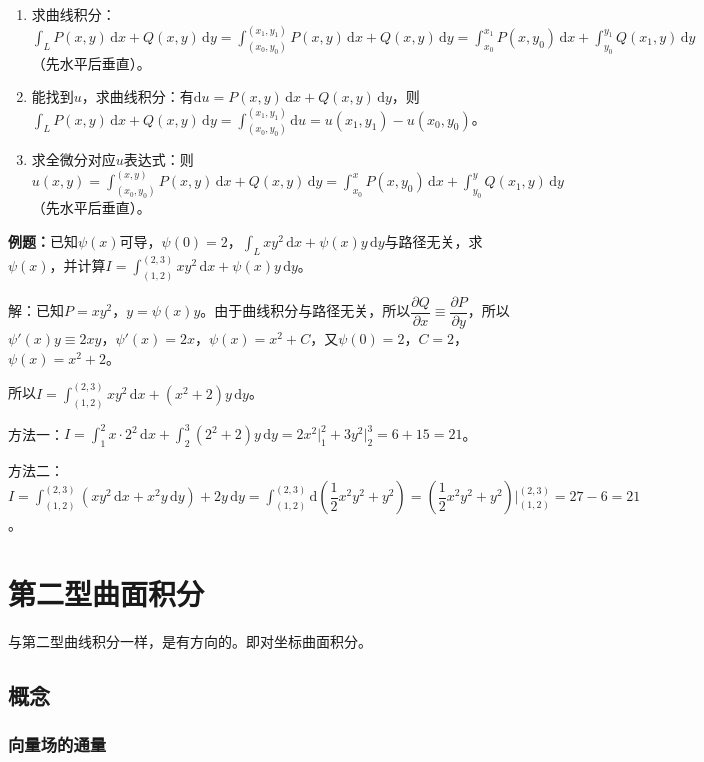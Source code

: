 \documentclass[UTF8, 12pt]{ctexart}
\begin{document}
        \begin{enumerate}
            \item 求曲线积分：$\int_LP(x,y)\,\textrm{d}x+Q(x,y)\,\textrm{d}y=\int_{(x_0,y_0)}^{(x_1,y_1)}P(x,y)\,\textrm{d}x+Q(x,y)\,\textrm{d}y=\int_{x_0}^{x_1}P(x,y_0)\,\textrm{d}x+\int_{y_0}^{y_1}Q(x_1,y)\,\textrm{d}y$（先水平后垂直）。
            \item 能找到$u$，求曲线积分：有$\textrm{d}u=P(x,y)\,\textrm{d}x+Q(x,y)\,\textrm{d}y$，则$\int_LP(x,y)\,\textrm{d}x+Q(x,y)\,\textrm{d}y=\int_{(x_0,y_0)}^{(x_1,y_1)}\textrm{d}u=u(x_1,y_1)-u(x_0,y_0)$。
            \item 求全微分对应$u$表达式：则$u(x,y)=\int_{(x_0,y_0)}^{(x,y)}P(x,y)\,\textrm{d}x+Q(x,y)\,\textrm{d}y=\int_{x_0}^xP(x,y_0)\,\textrm{d}x+\int_{y_0}^yQ(x_1,y)\,\textrm{d}y$（先水平后垂直）。
        \end{enumerate}

        \textbf{例题：}已知$\psi(x)$可导，$\psi(0)=2$，$\int_Lxy^2\,\textrm{d}x+\psi(x)y\,\textrm{d}y$与路径无关，求$\psi(x)$，并计算$I=\int_{(1,2)}^{(2,3)}xy^2\,\textrm{d}x+\psi(x)y\,\textrm{d}y$。

        解：已知$P=xy^2$，$y=\psi(x)y$。由于曲线积分与路径无关，所以$\dfrac{\partial Q}{\partial x}\equiv\dfrac{\partial P}{\partial y}$，所以$\psi'(x)y\equiv2xy$，$\psi'(x)=2x$，$\psi(x)=x^2+C$，又$\psi(0)=2$，$C=2$，$\psi(x)=x^2+2$。

        所以$I=\int_{(1,2)}^{(2,3)}xy^2\,\textrm{d}x+(x^2+2)y\,\textrm{d}y$。

        方法一：$I=\int_1^2x\cdot2^2\,\textrm{d}x+\int_2^3(2^2+2)y\,\textrm{d}y=2x^2\vert_1^2+3y^2\vert_2^3=6+15=21$。

        方法二：$I=\int_{(1,2)}^{(2,3)}(xy^2\,\textrm{d}x+x^2y\,\textrm{d}y)+2y\,\textrm{d}y=\int_{(1,2)}^{(2,3)}\textrm{d}(\dfrac{1}{2}x^2y^2+y^2)=(\dfrac{1}{2}x^2y^2+y^2)|_{(1,2)}^{(2,3)}=27-6=21$。

        \section{第二型曲面积分}

        与第二型曲线积分一样，是有方向的。即对坐标曲面积分。

        \subsection{概念}

        \subsubsection{向量场的通量}
\end{document}
